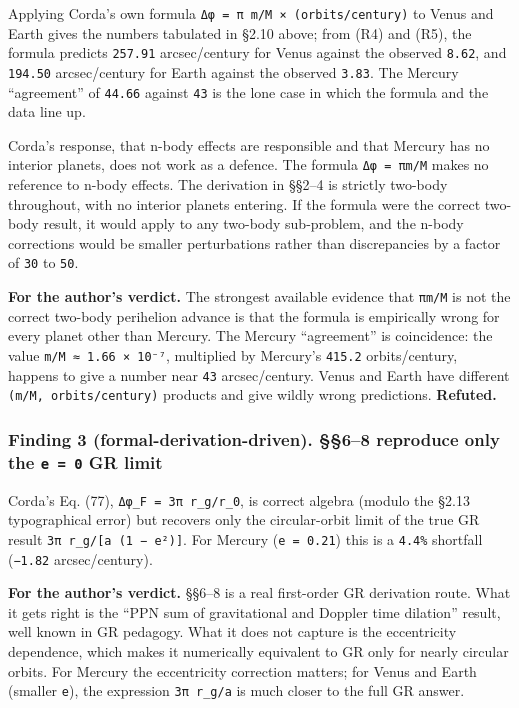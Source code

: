 \documentclass[
  11pt,
]{article}
\begin{document}
Applying Corda's own formula \texttt{Δφ\ =\ π\ m/M\ ×\ (orbits/century)}
to Venus and Earth gives the numbers tabulated in §2.10 above; from (R4)
and (R5), the formula predicts \texttt{257.91} arcsec/century for Venus
against the observed \texttt{8.62}, and \texttt{194.50} arcsec/century
for Earth against the observed \texttt{3.83}. The Mercury ``agreement''
of \texttt{44.66} against \texttt{43} is the lone case in which the
formula and the data line up.

Corda's response, that n-body effects are responsible and that Mercury
has no interior planets, does not work as a defence. The formula
\texttt{Δφ\ =\ πm/M} makes no reference to n-body effects. The
derivation in §§2--4 is strictly two-body throughout, with no interior
planets entering. If the formula were the correct two-body result, it
would apply to any two-body sub-problem, and the n-body corrections
would be smaller perturbations rather than discrepancies by a factor of
\texttt{30} to \texttt{50}.

\textbf{For the author's verdict.} The strongest available evidence that
\texttt{πm/M} is not the correct two-body perihelion advance is that the
formula is empirically wrong for every planet other than Mercury. The
Mercury ``agreement'' is coincidence: the value
\texttt{m/M\ ≈\ 1.66\ ×\ 10⁻⁷}, multiplied by Mercury's \texttt{415.2}
orbits/century, happens to give a number near \texttt{43}
arcsec/century. Venus and Earth have different
\texttt{(m/M,\ orbits/century)} products and give wildly wrong
predictions. \textbf{Refuted.}

\hypertarget{finding-3-formal-derivation-driven.-68-reproduce-only-the-e-0-gr-limit}{%
\subsubsection{\texorpdfstring{Finding 3 (formal-derivation-driven).
§§6--8 reproduce only the \texttt{e\ =\ 0} GR
limit}{Finding 3 (formal-derivation-driven). §§6--8 reproduce only the e = 0 GR limit}}\label{finding-3-formal-derivation-driven.-68-reproduce-only-the-e-0-gr-limit}}

Corda's Eq. (77), \texttt{Δφ\_F\ =\ 3π\ r\_g/r\_0}, is correct algebra
(modulo the §2.13 typographical error) but recovers only the
circular-orbit limit of the true GR result
\texttt{3π\ r\_g/{[}a\ (1\ −\ e²){]}}. For Mercury (\texttt{e\ =\ 0.21})
this is a \texttt{4.4\%} shortfall (\texttt{−1.82} arcsec/century).

\textbf{For the author's verdict.} §§6--8 is a real first-order GR
derivation route. What it gets right is the ``PPN sum of gravitational
and Doppler time dilation'' result, well known in GR pedagogy. What it
does not capture is the eccentricity dependence, which makes it
numerically equivalent to GR only for nearly circular orbits. For
Mercury the eccentricity correction matters; for Venus and Earth
(smaller \texttt{e}), the expression \texttt{3π\ r\_g/a} is much closer
to the full GR answer.
\end{document}
